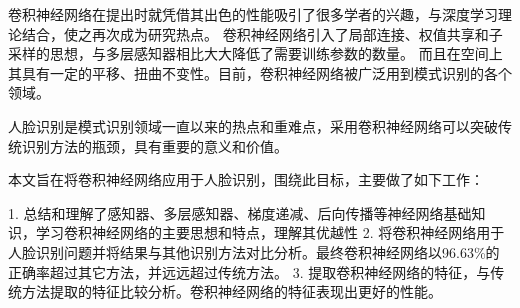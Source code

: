 \documentclass[bachelor,zhspacing]{cqu}  %
\begin{document}
\cnkind{****}
\enkind{****}
\makecntitle 
\makeentitle 

\setcounter{page}{0}
\begin{cnabstract}

卷积神经网络在提出时就凭借其出色的性能吸引了很多学者的兴趣，与深度学习理论结合，使之再次成为研究热点。
卷积神经网络引入了局部连接、权值共享和子采样的思想，与多层感知器相比大大降低了需要训练参数的数量。
而且在空间上其具有一定的平移、扭曲不变性。目前，卷积神经网络被广泛用到模式识别的各个领域。\par

人脸识别是模式识别领域一直以来的热点和重难点，采用卷积神经网络可以突破传统识别方法的瓶颈，具有重要的意义和价值。\par

本文旨在将卷积神经网络应用于人脸识别，围绕此目标，主要做了如下工作：

1.  总结和理解了感知器、多层感知器、梯度递减、后向传播等神经网络基础知识，学习卷积神经网络的主要思想和特点，理解其优越性
2.  将卷积神经网络用于人脸识别问题并将结果与其他识别方法对比分析。最终卷积神经网络以96.63\%的正确率超过其它方法，并远远超过传统方法。
3.  提取卷积神经网络的特征，与传统方法提取的特征比较分析。卷积神经网络的特征表现出更好的性能。

\end{cnabstract} 
\end{document}
